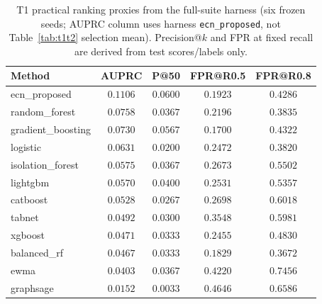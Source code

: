 \begin{table}[!t]
\centering
\caption{T1 practical ranking proxies from the full-suite harness (six frozen seeds; AUPRC column uses harness \texttt{ecn\_proposed}, not Table~\ref{tab:t1t2} selection mean). Precision@$k$ and FPR at fixed recall are derived from test scores/labels only.}
\label{tab:practical_v4}
{\footnotesize\begin{tabular}{lcccc}
\toprule
Method & AUPRC & P@50 & FPR@R0.5 & FPR@R0.8 \\
\midrule
ecn\_proposed & $0.1106$ & $0.0600$ & $0.1923$ & $0.4286$ \\
random\_forest & $0.0758$ & $0.0367$ & $0.2196$ & $0.3835$ \\
gradient\_boosting & $0.0730$ & $0.0567$ & $0.1700$ & $0.4322$ \\
logistic & $0.0631$ & $0.0200$ & $0.2472$ & $0.3820$ \\
isolation\_forest & $0.0575$ & $0.0367$ & $0.2673$ & $0.5502$ \\
lightgbm & $0.0570$ & $0.0400$ & $0.2531$ & $0.5357$ \\
catboost & $0.0528$ & $0.0267$ & $0.2698$ & $0.6018$ \\
tabnet & $0.0492$ & $0.0300$ & $0.3548$ & $0.5981$ \\
xgboost & $0.0471$ & $0.0333$ & $0.2455$ & $0.4830$ \\
balanced\_rf & $0.0467$ & $0.0333$ & $0.1829$ & $0.3672$ \\
ewma & $0.0403$ & $0.0367$ & $0.4220$ & $0.7456$ \\
graphsage & $0.0152$ & $0.0033$ & $0.4646$ & $0.6586$ \\
\bottomrule
\end{tabular}}
\end{table}
